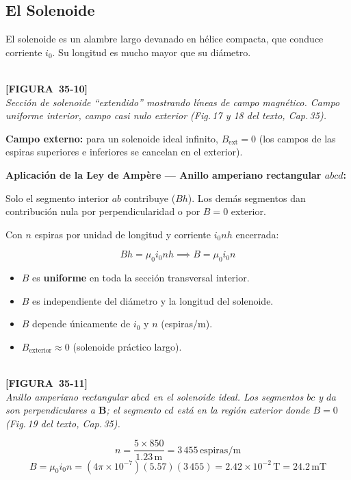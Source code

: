 \documentclass[12pt, letterpaper]{report}
\numberwithin{equation}{section}
\newcommand{\vB}[1]{\boldsymbol{#1}}          %
\newcommand{\un}[1]{\,\mathrm{#1}}            %
\newcommand{\figplaceholder}[2]{%
  \begin{tcolorbox}[figbox]
    \centering
    \textcolor{NavyBlue!50}{\rule{0pt}{2.8cm}}\\[4pt]
    {\small\color{NavyBlue}\textbf{[FIGURA\ #1]}\\[2pt]
    \textit{#2}}
  \end{tcolorbox}
}
\begin{document}
\subsection{El Solenoide}

El solenoide es un alambre largo devanado en hélice compacta, que conduce
corriente $i_0$. Su longitud es mucho mayor que su diámetro.

\figplaceholder{35-10}{Sección de solenoide ``extendido'' mostrando líneas de
campo magnético. Campo uniforme interior, campo casi nulo exterior
(Fig.\,17 y 18 del texto, Cap.\,35).}

\textbf{Campo externo:} para un solenoide ideal infinito, $B_\text{ext}=0$
(los campos de las espiras superiores e inferiores se cancelan en el exterior).

\textbf{Aplicación de la Ley de Ampère — Anillo amperiano rectangular $abcd$:}

Solo el segmento interior $ab$ contribuye ($Bh$). Los demás segmentos dan
contribución nula por perpendicularidad o por $B=0$ exterior.

Con $n$ espiras por unidad de longitud y corriente $i_0n h$ encerrada:

\begin{equation}
  Bh = \mu_0 i_0 n h \implies
  \boxed{B = \mu_0 i_0 n}
  \label{eq:Bsolenoide}
\end{equation}

\begin{tcolorbox}[propbox, title=Propiedades del campo en el solenoide ideal]
  \begin{itemize}[leftmargin=1.5em, itemsep=2pt]
    \item $B$ es \textbf{uniforme} en toda la sección transversal interior.
    \item $B$ es independiente del diámetro y la longitud del solenoide.
    \item $B$ depende únicamente de $i_0$ y $n$ (espiras/m).
    \item $B_\text{exterior}\approx0$ (solenoide práctico largo).
  \end{itemize}
\end{tcolorbox}

\figplaceholder{35-11}{Anillo amperiano rectangular $abcd$ en el solenoide ideal.
Los segmentos $bc$ y $da$ son perpendiculares a $\vB{B}$; el segmento $cd$
está en la región exterior donde $B=0$ (Fig.\,19 del texto, Cap.\,35).}

\begin{tcolorbox}[exbox,
  title=Ejemplo — Solenoide ($L=1.23\un{m}$, $d=3.55\un{cm}$,
  5 capas de 850 espiras, $i_0=5.57\un{A}$)]
  \[
    n = \frac{5\times850}{1.23\un{m}} = 3\,455\un{espiras/m}
  \]
  \[
    B = \mu_0 i_0 n
      = (4\pi\times10^{-7})(5.57)(3\,455)
      = 2.42\times10^{-2}\un{T} = 24.2\un{mT}
  \]
\end{tcolorbox}
\end{document}
